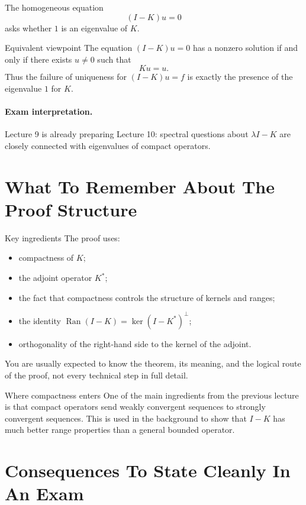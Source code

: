 \documentclass[11pt]{article}
\begin{document}
\begin{focusbox}
The homogeneous equation
\[
(I-K)u=0
\]
asks whether $1$ is an eigenvalue of $K$.
\end{focusbox}

\begin{thmbox}{Equivalent viewpoint}
The equation $(I-K)u=0$ has a nonzero solution if and only if there exists $u\neq 0$ such that
\[
Ku=u.
\]
Thus the failure of uniqueness for $(I-K)u=f$ is exactly the presence of the eigenvalue $1$ for $K$.
\end{thmbox}

\paragraph{Exam interpretation.}
Lecture 9 is already preparing Lecture 10: spectral questions about $\lambda I-K$ are closely connected with eigenvalues of compact operators.

\section{What To Remember About The Proof Structure}

\begin{exbox}{Key ingredients}
The proof uses:
\begin{itemize}
\item compactness of $K$;
\item the adjoint operator $K^*$;
\item the fact that compactness controls the structure of kernels and ranges;
\item the identity $\operatorname{Ran}(I-K)=\ker(I-K^*)^{\perp}$;
\item orthogonality of the right-hand side to the kernel of the adjoint.
\end{itemize}
You are usually expected to know the theorem, its meaning, and the logical route of the proof, not every technical step in full detail.
\end{exbox}

\begin{warningbox}{Where compactness enters}
One of the main ingredients from the previous lecture is that compact operators send weakly convergent sequences to strongly convergent sequences. This is used in the background to show that $I-K$ has much better range properties than a general bounded operator.
\end{warningbox}

\section{Consequences To State Cleanly In An Exam}
\end{document}
